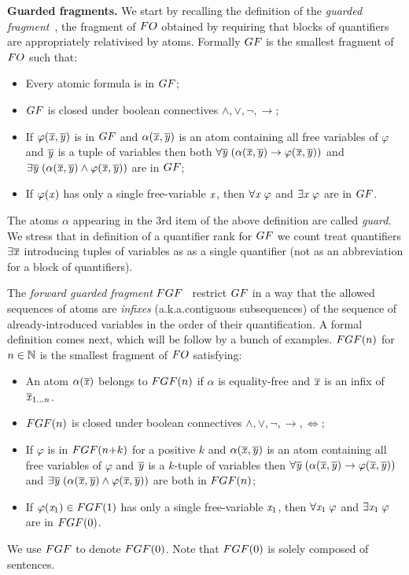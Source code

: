 \documentclass[a4paper,UKenglish,cleveref, autoref, thm-restate, hideLIPIcs]{lipics-v2021}
\begin{document}
\noindent \textbf{Guarded fragments.}
We start by recalling the definition of the \emph{guarded fragment}~\cite{AndrekaNB98}, \ie the fragment of $\FO$ obtained by requiring that blocks of quantifiers are appropriately relativised by atoms.
Formally $\GF$ is the smallest fragment of $\FO$  such that:
\begin{itemize}\itemsep0em
    \item Every atomic formula is in $\GF$;
    \item $\GF$ is closed under boolean connectives $\land, \lor, \neg, \to$;
    \item If $\varphi(\overline{\mathit{x}}, \overline{\mathit{y}})$ is in $\GF$ and $\alpha(\overline{\mathit{x}}, \overline{\mathit{y}})$ is an atom containing all free variables of $\varphi$ and $\overline{\mathit{y}}$ is a tuple of variables then both $\forall{\overline{\mathit{y}}} \; (\alpha(\overline{\mathit{x}}, \overline{\mathit{y}}) \to \varphi(\overline{\mathit{x}}, \overline{\mathit{y}}))$ and $\exists{\overline{\mathit{y}}} \; (\alpha(\overline{\mathit{x}}, \overline{\mathit{y}}) \land \varphi(\overline{\mathit{x}}, \overline{\mathit{y}}))$ are in $\GF$; 
    \item If $\varphi(\mathit{x})$ has only a single free-variable $\mathit{x}$, then $\forall{\mathit{x}}\; \varphi$ and $\exists{\mathit{x}}\; \varphi$ are in $\GF$.
\end{itemize}
The atoms $\alpha$ appearing in the 3rd item of the above definition are called \emph{guard}.
We stress that in definition of a quantifier rank for $\GF$ we count treat quantifiers $\exists{\overline{\mathit{x}}}$ introducing tuples of variables as as a single quantifier (not as an abbreviation for a block of quantifiers).

The \emph{forward guarded fragment} $\FGF$~\cite{Bednarczyk21} restrict $\GF$ in a way that the allowed sequences of atoms are \emph{infixes} (a.k.a.\@ contiguous subsequences) of the sequence of already-introduced variables in the order of their quantification.
A formal definition comes next, which will be follow by a bunch of examples.
$\FGF(n)$ for $n \in {\mathbb{N}}$ is the smallest fragment of $\FO$ satisfying:
\begin{itemize}\itemsep0em
    \item An atom $\alpha(\overline{\mathit{x}})$ belongs to $\FGF(n)$ if $\alpha$ is equality-free and $\overline{\mathit{x}}$ is an infix of $\overline{\mathit{x}}_{1\ldots n}$.
    \item $\FGF(n)$ is closed under boolean connectives $\land, \lor, \neg, \to, \iff$;
    \item If $\varphi$ is in $\FGF(n{+}k)$ for a positive $k$ and $\alpha(\overline{\mathit{x}}, \overline{\mathit{y}})$ is an atom containing all free variables of $\varphi$ and $\overline{\mathit{y}}$ is a $k$-tuple of variables then  $\forall{\overline{\mathit{y}}} \; (\alpha(\overline{\mathit{x}}, \overline{\mathit{y}}) \to \varphi(\overline{\mathit{x}}, \overline{\mathit{y}}))$ and $\exists{\overline{\mathit{y}}} \; (\alpha(\overline{\mathit{x}}, \overline{\mathit{y}}) \land \varphi(\overline{\mathit{x}}, \overline{\mathit{y}}))$ are both in $\FGF(n)$; 
    \item If $\varphi(\varx_1) \in \FGF(1)$ has only a single free-variable $\mathit{x}_1$, then $\forall{\mathit{x}_1}\; \varphi$ and $\exists{\mathit{x}_1}\; \varphi$ are in $\FGF(0)$.
\end{itemize}
We use $\FGF$ to denote $\FGF(0)$. 
Note that $\FGF(0)$ is solely composed of sentences. 
\end{document}
